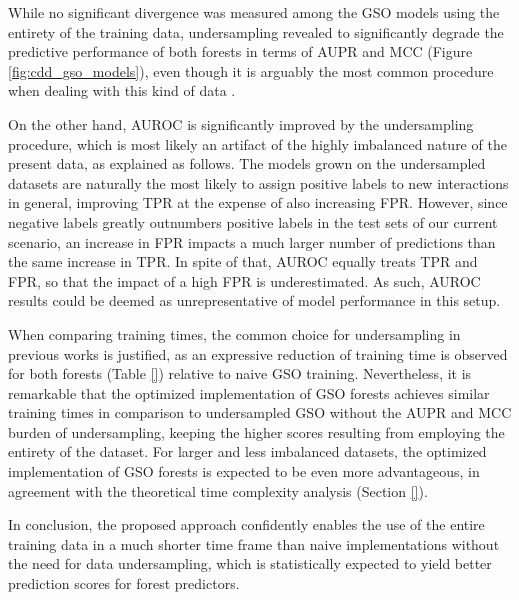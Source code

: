 While no significant divergence was measured among the GSO models using the entirety of the training data, undersampling revealed to significantly degrade the predictive performance of both forests in terms of AUPR and MCC (Figure \ref{fig:cdd_gso_models}), even though it is arguably the most common procedure when dealing with this kind of data \cite{}.

On the other hand, AUROC is significantly improved by the undersampling procedure, which is most likely an artifact of the highly imbalanced nature of the present data, as explained as follows. The models grown on the undersampled datasets are naturally the most likely to assign positive labels to new interactions in general, improving TPR at the expense of also increasing FPR. However, since negative labels greatly outnumbers positive labels in the test sets of our current scenario, an increase in FPR impacts a much larger number of predictions than the same increase in TPR. In spite of that, AUROC equally treats TPR and FPR, so that the impact of a high FPR is underestimated. As such, AUROC results could be deemed as unrepresentative of model performance in this setup.



When comparing training times, the common choice for undersampling in previous works is justified, as an expressive reduction of training time is observed for both forests (Table \ref{}) relative to naive GSO training. Nevertheless, it is remarkable that the optimized implementation of GSO forests achieves similar training times in comparison to undersampled GSO without the AUPR and MCC burden of undersampling, keeping the higher scores resulting from employing the entirety of the dataset. For larger and less imbalanced datasets, the optimized implementation of GSO forests is expected to be even more advantageous, in agreement with the theoretical time complexity analysis (Section \ref{}).

%    

In conclusion, the proposed approach confidently enables the use of the entire training data in a much shorter time frame than naive implementations without the need for data undersampling, which is statistically expected to yield better prediction scores for forest predictors.


